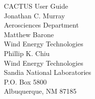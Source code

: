 \begin{titlingpage}
\clearpage\thispagestyle{empty}

\begin{center}
 {\sffamily\huge CACTUS User Guide\\}
 \vspace{1.5cm}
 {\Large Jonathan C. Murray \\ Aerosciences Department}\\[5pt]

 \vspace{1.5cm}
 {\Large Matthew Barone \\ Wind Energy Technologies}\\[5pt]

 \vspace{1.5cm}
 {\Large Phillip K. Chiu \\ Wind Energy Technologies}\\[5pt]
 \vspace{8cm}
{\Large Sandia National Laboratories \\
P.O. Box 5800 \\
Albuquerque, NM 87185 \\}
 \end{center}
 \end{titlingpage}